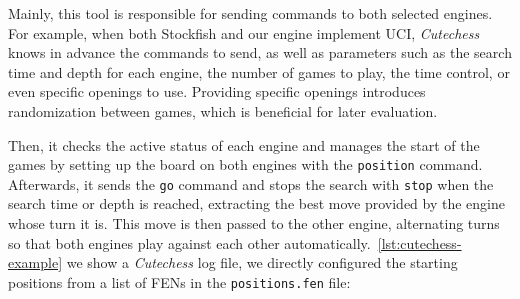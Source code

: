 \noindent Mainly, this tool is responsible for sending commands to both selected engines. For example, when both Stockfish and our engine implement UCI, \textit{Cutechess} knows in advance the commands to send, as well as parameters such as the search time and depth for each engine, the number of games to play, the time control, or even specific openings to use. Providing specific openings introduces randomization between games, which is beneficial for later evaluation.

\vspace{1em}

\noindent Then, it checks the active status of each engine and manages the start of the games by setting up the board on both engines with the \texttt{position} command. Afterwards, it sends the \texttt{go} command and stops the search with \texttt{stop} when the search time or depth is reached, extracting the best move provided by the engine whose turn it is. This move is then passed to the other engine, alternating turns so that both engines play against each other automatically.~\cref{lst:cutechess-example} we show a \textit{Cutechess} log file, we directly configured the starting positions from a list of FENs in the \texttt{positions.fen} file:

